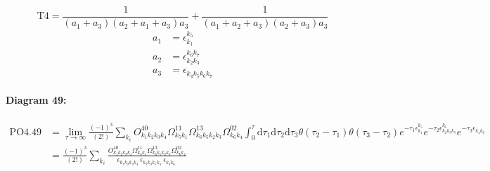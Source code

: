 \documentclass[10pt,a4paper]{article}
\begin{document}
\begin{equation}
\text{T}4 = \frac{1}{(a_1+ a_3)(a_2+ a_1+ a_3)a_3} + \frac{1}{(a_1+ a_2+ a_3)(a_2+ a_3)a_3}\end{equation}
\begin{align*}
a_1 &= \epsilon^{k_{5}}_{k_{1}}\\
a_2 &= \epsilon^{k_{6}k_{7}}_{k_{2}k_{3}}\\
a_3 &= \epsilon^{}_{k_{4}k_{5}k_{6}k_{7}}
\end{align*}
\paragraph{Diagram 49:}
\begin{align}
\text{PO}4.49
&= \lim\limits_{\tau \to \infty}\frac{(-1)^3 }{(2!)}\sum_{k_i}O^{40}_{k_{1}k_{2}k_{3}k_{4}} \Omega^{11}_{k_{5}k_{1}} \Omega^{13}_{k_{6}k_{5}k_{2}k_{3}} \Omega^{02}_{k_{6}k_{4}} \int_{0}^{\tau}\mathrm{d}\tau_1\mathrm{d}\tau_2\mathrm{d}\tau_3\theta(\tau_2-\tau_1) \theta(\tau_3-\tau_2) e^{-\tau_1 \epsilon^{k_{5}}_{k_{1}}}e^{-\tau_2 \epsilon^{k_{6}}_{k_{2}k_{3}k_{5}}}e^{-\tau_3 \epsilon^{}_{k_{4}k_{6}}}
 \nonumber \\
&= \frac{(-1)^3 }{(2!)}\sum_{k_i}\frac{O^{40}_{k_{1}k_{2}k_{3}k_{4}} \Omega^{11}_{k_{5}k_{1}} \Omega^{13}_{k_{6}k_{5}k_{2}k_{3}} \Omega^{02}_{k_{6}k_{4}} }{\epsilon^{}_{k_{1}k_{2}k_{3}k_{4}}\ \epsilon^{}_{k_{2}k_{3}k_{5}k_{4}}\ \epsilon^{}_{k_{4}k_{6}}\ } 
\end{align}
\end{document}
